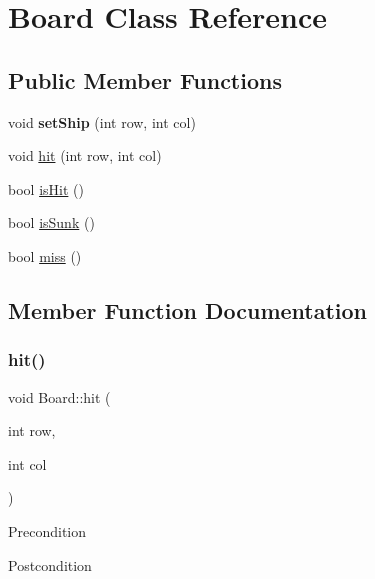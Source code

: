 \hypertarget{classBoard}{}\section{Board Class Reference}
\label{classBoard}
\subsection*{Public Member Functions}
\begin{DoxyCompactItemize}
\item 
\mbox{\label{classBoard_ac91459b71b1d94be33fe02bcb21c182e}} 
void {\bfseries set\+Ship} (int row, int col)
\item 
void \mbox{\hyperlink{classBoard_abbbcf159450dc2114a00936452b15cad}{hit}} (int row, int col)
\item 
bool \mbox{\hyperlink{classBoard_a785d6203e06e8d588c88574c34feff7c}{is\+Hit}} ()
\item 
bool \mbox{\hyperlink{classBoard_a242488b02ce0a370c7648df567aa7ec0}{is\+Sunk}} ()
\item 
bool \mbox{\hyperlink{classBoard_a058b6c42434ce8f8f313cc78ebcaac74}{miss}} ()
\end{DoxyCompactItemize}


\subsection{Member Function Documentation}
\mbox{\label{classBoard_abbbcf159450dc2114a00936452b15cad}} 
\subsubsection{\texorpdfstring{hit()}{hit()}}
{\footnotesize\ttfamily void Board\+::hit (\begin{DoxyParamCaption}\item[{int}]{row,  }\item[{int}]{col }\end{DoxyParamCaption})}

\begin{DoxyPrecond}{Precondition}

\end{DoxyPrecond}
\begin{DoxyPostcond}{Postcondition}

\end{DoxyPostcond}
\mbox{\label{classBoard_a785d6203e06e8d588c88574c34feff7c}} 
